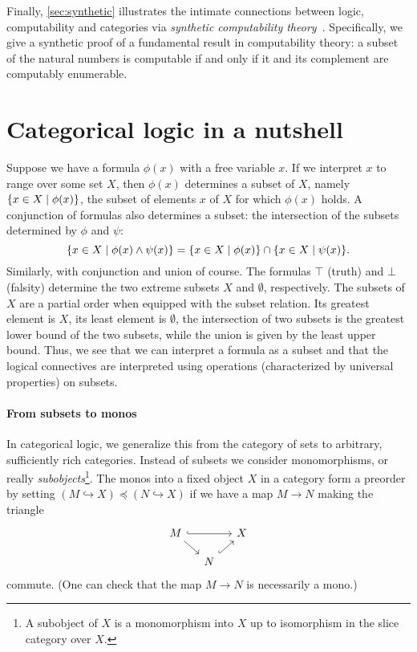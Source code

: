 Finally, \cref{sec:synthetic} illustrates the intimate connections between
logic, computability and categories via \emph{synthetic computability
  theory}~\cite{Bauer2006}. Specifically, we give a synthetic proof of a
fundamental result in computability theory: a subset of the natural numbers is
computable if and only if it and its complement are computably enumerable.


\section{Categorical logic in a nutshell}\label{sec:categorical-logic}
Suppose we have a formula \(\phi(x)\) with a free variable \(x\). If we
interpret \(x\) to range over some set \(X\), then \(\phi(x)\) determines a
subset of \(X\), namely \(\{x \in X \mid \phi(x)\}\), the subset of elements
\(x\) of \(X\) for which \(\phi(x)\) holds.
%
A conjunction of formulas also determines a subset: the
intersection of the subsets determined by \(\phi\) and \(\psi\):
\[
  \{x \in X \mid \phi(x) \land \psi(x)\}
  = \{x \in X \mid \phi(x)\} \cap \{x \in X \mid \psi(x)\}.
\]
Similarly, with conjunction and union of course.
%
The formulas \(\top\) (truth) and \(\bot\) (falsity) determine the two extreme
subsets \(X\) and \(\emptyset\), respectively.
%
The subsets of \(X\) are a partial order when equipped with the subset
relation. Its greatest element is \(X\), its least element is \(\emptyset\), the
intersection of two subsets is the greatest lower bound of the two subsets,
while the union is given by the least upper bound.
%
Thus, we see that we can interpret a formula as a subset and that the logical
connectives are interpreted using operations (characterized by universal
properties) on subsets.

\paragraph{From subsets to monos}
In categorical logic, we generalize this from the category of sets to arbitrary,
sufficiently rich categories.
%
Instead of subsets we consider monomorphisms, or really
\emph{subobjects}\footnote{A subobject of \(X\) is a monomorphism into
  \(X\) up to isomorphism in the slice category over \(X\).}.
%
The monos into a fixed object \(X\) in a category form a preorder by setting
\((M \hookrightarrow X) \preceq (N \hookrightarrow X)\) if we have a map
\(M \to N\) making the triangle
\[
  \begin{tikzcd}[row sep=4mm,column sep=4mm]
    M \ar[dr] \ar[rr,hookrightarrow] & & X \\
    & N \ar[ur,hookrightarrow]
  \end{tikzcd}
\]
commute. (One can check that the map \(M \to N\) is necessarily a mono.)


